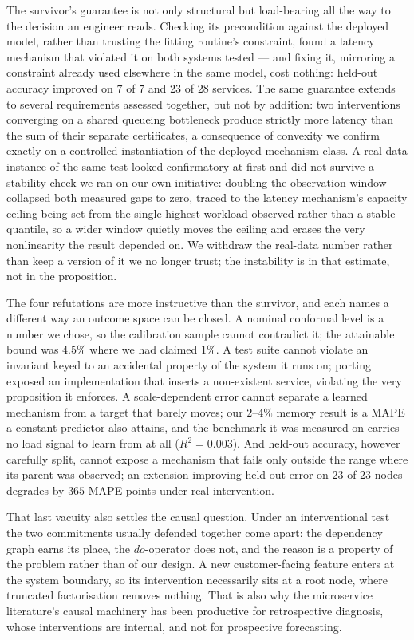 \documentclass[journal, 10pt]{IEEEtran}
\begin{document}
The survivor's guarantee is not only structural but load-bearing all the way to
the decision an engineer reads. Checking its precondition against the deployed
model, rather than trusting the fitting routine's constraint, found a latency
mechanism that violated it on both systems tested --- and fixing it, mirroring
a constraint already used elsewhere in the same model, cost nothing: held-out
accuracy improved on $7$ of $7$ and $23$ of $28$ services. The same guarantee
extends to several requirements assessed together, but not by addition: two
interventions converging on a shared queueing bottleneck produce strictly more
latency than the sum of their separate certificates, a consequence of convexity
we confirm exactly on a controlled instantiation of the deployed mechanism
class. A real-data instance of the same test looked confirmatory at first and
did not survive a stability check we ran on our own initiative: doubling the
observation window collapsed both measured gaps to zero, traced to the latency
mechanism's capacity ceiling being set from the single highest workload
observed rather than a stable quantile, so a wider window quietly moves the
ceiling and erases the very nonlinearity the result depended on. We withdraw
the real-data number rather than keep a version of it we no longer trust; the
instability is in that estimate, not in the proposition.

The four refutations are more instructive than the survivor, and each names a
different way an outcome space can be closed. A nominal conformal level is a
number we chose, so the calibration sample cannot contradict it; the attainable
bound was $4.5\%$ where we had claimed $1\%$. A test suite cannot violate an
invariant keyed to an accidental property of the system it runs on; porting
exposed an implementation that inserts a non-existent service, violating the very
proposition it enforces. A scale-dependent error cannot separate a learned
mechanism from a target that barely moves; our $2$--$4\%$ memory result is a MAPE
a constant predictor also attains, and the benchmark it was measured on carries
no load signal to learn from at all ($R^2 = 0.003$). And held-out accuracy,
however carefully split, cannot expose a mechanism that fails only outside the
range where its parent was observed; an extension improving held-out error on
$23$ of $23$ nodes degrades by $365$ MAPE points under real intervention.

That last vacuity also settles the causal question. Under an interventional test
the two commitments usually defended together come apart: the dependency graph
earns its place, the $do$-operator does not, and the reason is a property of the
problem rather than of our design. A new customer-facing feature enters at the
system boundary, so its intervention necessarily sits at a root node, where
truncated factorisation removes nothing. That is also why the microservice
literature's causal machinery has been productive for retrospective diagnosis,
whose interventions are internal, and not for prospective forecasting.
\end{document}

